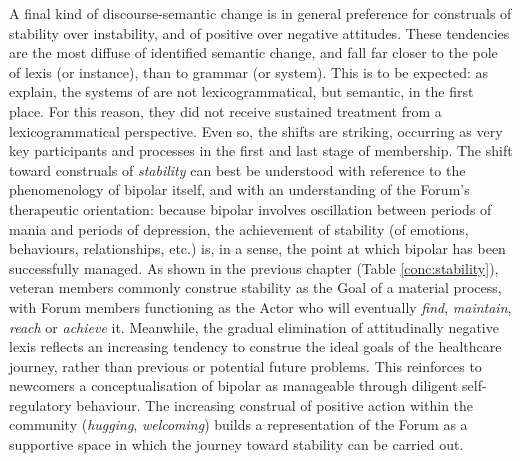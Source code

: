 
A final kind of \gls{discourse-semantic} change is in general preference for construals of stability over instability, and of positive over negative attitudes. These tendencies are the most diffuse of identified semantic change, and fall far closer to the pole of lexis (or instance), than to grammar (or system). This is to be expected: as \textcite{martin_language_2005} explain, the systems of  are not lexicogrammatical, but semantic, in the first place. For this reason, they did not receive sustained treatment from a lexicogrammatical perspective. Even so, the shifts are striking, occurring as very key participants and processes in the first and last stage of membership. The shift toward construals of \emph{stability} can best be understood with reference to the phenomenology of \gls{bipolar} itself, and with an understanding of the \gls{Forum}'s therapeutic orientation: because \gls{bipolar} involves oscillation between periods of mania and periods of depression, the achievement of stability (of emotions, behaviours, relationships, etc.) is, in a sense, the point at which \gls{bipolar} has been successfully managed. As shown in the previous chapter (Table \ref{conc:stability}), veteran members commonly construe stability as the Goal of a material process, with \gls{Forum} \glspl{member} functioning as the Actor who will eventually \emph{find}, \emph{maintain}, \emph{reach} or \emph{achieve} it. Meanwhile, the gradual elimination of attitudinally negative lexis reflects an increasing tendency to construe the ideal goals of the healthcare journey, rather than previous or potential future problems. This reinforces to newcomers a conceptualisation of \gls{bipolar} as manageable through diligent self\hyp{}regulatory behaviour. The increasing construal of positive action within the community (\emph{hugging}, \emph{welcoming}) builds a representation of the \gls{Forum} as a supportive space in which the journey toward stability can be carried out.



